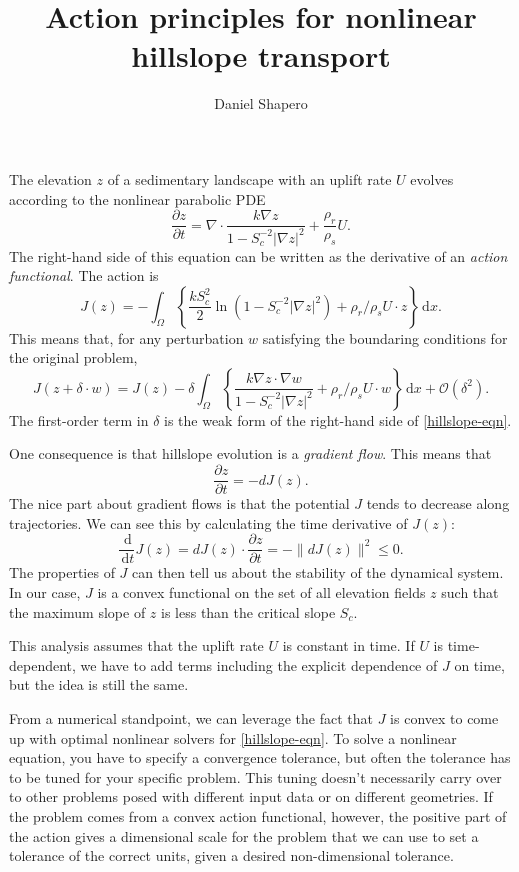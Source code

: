 \documentclass{article}
\title{Action principles for nonlinear hillslope transport}
\author{Daniel Shapero}
\date{}
\theoremstyle{definition}
\theoremstyle{plain}
\newcommand{\ud}{\hspace{2pt}\mathrm{d}}
\begin{document}
\maketitle

The elevation $z$ of a sedimentary landscape with an uplift rate $U$ evolves according to the nonlinear parabolic PDE
\begin{equation}
    \frac{\partial z}{\partial t} = \nabla\cdot\frac{k\nabla z}{1 - S_c^{-2}|\nabla z|^2} + \frac{\rho_r}{\rho_s}U.
\label{hillslope-eqn}\end{equation}
The right-hand side of this equation can be written as the derivative of an \emph{action functional}.
The action is
\begin{equation}
    J(z) = -\int_\Omega\left\{\frac{k S_c^2}{2}\ln\left(1 - S_c^{-2}|\nabla z|^2\right) + \rho_r/\rho_s U\cdot z\right\}\ud x.
\end{equation}
This means that, for any perturbation $w$ satisfying the boundaring conditions for the original problem,
\begin{equation}
    J(z + \delta\cdot w) = J(z) - \delta\int_\Omega\left\{\frac{k\nabla z\cdot \nabla w}{1 - S_c^{-2}|\nabla z|^2} + \rho_r/\rho_s U\cdot w\right\}\ud x + \mathcal{O}(\delta^2).
\end{equation}
The first-order term in $\delta$ is the weak form of the right-hand side of \eqref{hillslope-eqn}.

One consequence is that hillslope evolution is a \emph{gradient flow}.
This means that
\begin{equation}
    \frac{\partial z}{\partial t} = -dJ(z).
\end{equation}
The nice part about gradient flows is that the potential $J$ tends to decrease along trajectories.
We can see this by calculating the time derivative of $J(z)$:
\begin{equation}
    \frac{\ud}{\ud t}J(z) = dJ(z)\cdot\frac{\partial z}{\partial t} = -\|dJ(z)\|^2 \le 0.
\end{equation}
The properties of $J$ can then tell us about the stability of the dynamical system.
In our case, $J$ is a convex functional on the set of all elevation fields $z$ such that the maximum slope of $z$ is less than the critical slope $S_c$.

This analysis assumes that the uplift rate $U$ is constant in time.
If $U$ is time-dependent, we have to add terms including the explicit dependence of $J$ on time, but the idea is still the same.

From a numerical standpoint, we can leverage the fact that $J$ is convex to come up with optimal nonlinear solvers for \eqref{hillslope-eqn}.
To solve a nonlinear equation, you have to specify a convergence tolerance, but often the tolerance has to be tuned for your specific problem.
This tuning doesn't necessarily carry over to other problems posed with different input data or on different geometries.
If the problem comes from a convex action functional, however, the positive part of the action gives a dimensional scale for the problem that we can use to set a tolerance of the correct units, given a desired non-dimensional tolerance.
\end{document}
